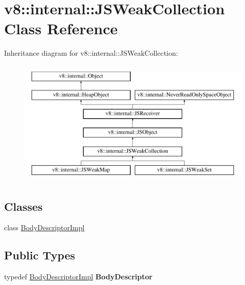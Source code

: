 \hypertarget{classv8_1_1internal_1_1JSWeakCollection}{}\section{v8\+:\+:internal\+:\+:J\+S\+Weak\+Collection Class Reference}
\label{classv8_1_1internal_1_1JSWeakCollection}
Inheritance diagram for v8\+:\+:internal\+:\+:J\+S\+Weak\+Collection\+:\begin{figure}[H]
\begin{center}
\leavevmode
\includegraphics[height=6.000000cm]{classv8_1_1internal_1_1JSWeakCollection}
\end{center}
\end{figure}
\subsection*{Classes}
\begin{DoxyCompactItemize}
\item 
class \mbox{\hyperlink{classv8_1_1internal_1_1JSWeakCollection_1_1BodyDescriptorImpl}{Body\+Descriptor\+Impl}}
\end{DoxyCompactItemize}
\subsection*{Public Types}
\begin{DoxyCompactItemize}
\item 
\mbox{\label{classv8_1_1internal_1_1JSWeakCollection_a16ea5474be7716ca508b000b6c67f42a}} 
typedef \mbox{\hyperlink{classv8_1_1internal_1_1JSWeakCollection_1_1BodyDescriptorImpl}{Body\+Descriptor\+Impl}} {\bfseries Body\+Descriptor}
\end{DoxyCompactItemize}
